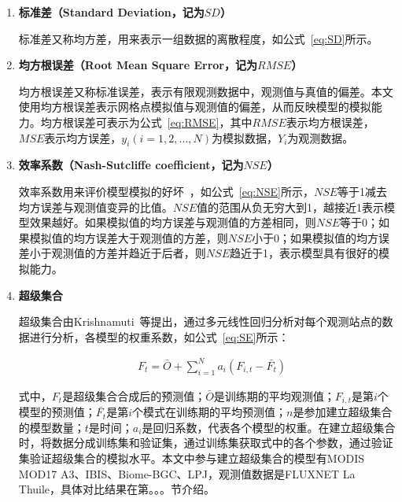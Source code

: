 \begin{enumerate}[(1)]
\item \textbf{标准差（Standard Deviation，记为$SD$）}

标准差又称均方差，用来表示一组数据的离散程度，如公式~\ref{eq:SD}所示。

\item \textbf{均方根误差（Root Mean Square Error，记为$RMSE$）}

均方根误差又称标准误差，表示有限观测数据中，观测值与真值的偏差。本文使用均方根误差表示网格点模拟值与观测值的偏差，从而反映模型的模拟能力。均方根误差可表示为公式~\ref{eq:RMSE}，其中$RMSE$表示均方根误差，$MSE$表示均方误差，$y_i(i=1,2,...,N)$为模拟数据，$Y_i$为观测数据。

\item \textbf{效率系数（Nash-Sutcliffe coefficient，记为$NSE$）}

效率系数用来评价模型模拟的好坏~\cite{gordon2003climate}，如公式~\ref{eq:NSE}所示，$NSE$等于1减去均方误差与观测值变异的比值。$NSE$值的范围从负无穷大到1，越接近1表示模型效果越好。如果模拟值的均方误差与观测值的方差相同，则$NSE$等于0；如果模拟值的均方误差大于观测值的方差，则$NSE$小于0；如果模拟值的均方误差小于观测值的方差并趋近于后者，则$NSE$趋近于1，表示模型具有很好的模拟能力。

\item \textbf{超级集合}

超级集合由Krishnamuti~\cite{krishnamurti1999improved}等提出，通过多元线性回归分析对每个观测站点的数据进行分析，各模型的权重系数，如公式~\ref{eq:SE}所示：

\begin{align}
    &F_t = \bar{O} + \sum\nolimits_{i=1}^{N}a_i\left(F_{i,t}-\bar{F_t}\right)
    \label{eq:SE}
\end{align}

式中，$F_t$是超级集合合成后的预测值；$\bar{O}$是训练期的平均观测值；$F_{i,t}$是第$i$个模型的预测值；$\bar{F_t}$是第$i$个模式在训练期的平均预测值；$n$是参加建立超级集合的模型数量；$t$是时间；$a_i$是回归系数，代表各个模型的权重。在建立超级集合时，将数据分成训练集和验证集，通过训练集获取式中的各个参数，通过验证集验证超级集合的模拟水平。本文中参与建立超级集合的模型有MODIS MOD17 A3、IBIS、Biome-BGC、LPJ，观测值数据是FLUXNET La Thuile，具体对比结果在第。。。节介绍。

\end{enumerate}

